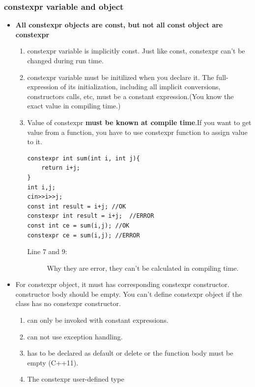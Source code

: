 \documentclass[a4paper,11pt,twoside]{book}
\begin{document}
\subsubsection{constexpr variable and object}
\begin{itemize}
	\item \textbf{All constexpr objects are const, but not all const object are constexpr}
	\begin{enumerate}
		\item constexpr variable is implicitly const. Just like const, constexpr can't be changed during run time.
		
		\item constexpr variable must be initilized when you declare it. The full-expression of its initialization, including all implicit conversions, constructors calls, etc, must be a constant expression.(You know the exact value in compiling time.)
		
		\item Value of constexpr \textbf{must be known at compile time}.If you want to get value from a function, you have to use constexpr function to assign value to it. 
		
\begin{lstlisting}
constexpr int sum(int i, int j){
	return i+j;
}
int i,j;
cin>>i>>j;
const int result = i+j; //OK
constexpr int result = i+j;  //ERROR
const int ce = sum(i,j); //OK
constexpr ce = sum(i,j); //ERROR
\end{lstlisting}
\begin{description}
	\item[Line 7 and 9:] Why they are error, they can't be calculated in compiling time.
\end{description}
		
\end{enumerate}
	
	\item For constexpr object, it must has corresponding  constexpr constructor. constructor body should be empty. You can't define constexpr object if the class has no constexpr constructor.
	\begin{enumerate}
		\item can only be invoked with constant expressions.
		\item can not use exception handling.
		\item has to be declared as default or delete or the function body must be empty (C++11).
		\item The constexpr user-defined type
	\end{enumerate}
	

\end{itemize}
\end{document}
